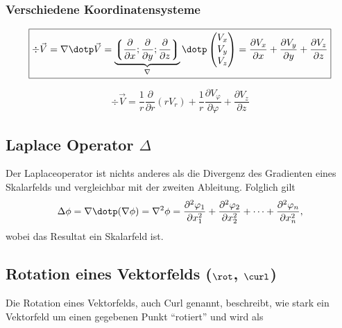 \subsubsection{Verschiedene Koordinatensysteme}
\[
    \boxed{
        \div \vec{V}
        = \nabla\dotp\vec{V}
        = \underbrace{%
            \left\lgroup%
                \frac{\partial}{\partial x};\frac{\partial}{\partial y};\frac{\partial}{\partial z}%
            \right\rgroup}_{\nabla} \dotp 
        \begin{pmatrix}
            V_x \\ V_y \\ V_z
        \end{pmatrix}
        = \frac{\partial V_x}{\partial x} + \frac{\partial V_y}{\partial y} + \frac{\partial V_z}{\partial z}
    }
\]

\[
    \boxed{
        \div \vec{V} = \frac{1}{r} \frac{\partial}{\partial r} (rV_r) + \frac{1}{r} \frac{\partial V_\varphi}{\partial \varphi} + \frac{\partial V_z}{\partial z}
    }
\]


\subsection[Laplace Operator Delta]{Laplace Operator $\Delta$}
Der Laplaceoperator ist nichts anderes als die Divergenz des Gradienten eines Skalarfelds und vergleichbar mit der zweiten Ableitung.
Folglich gilt
\[
    \Delta \phi = \nabla \dotp (\nabla \phi) = \nabla^2 \phi = \frac{\partial^2 \varphi_1}{\partial x_1^2} + \frac{\partial^2 \varphi_2}{\partial x_2^2} + \dots + \frac{\partial^2 \varphi_n}{\partial x_n^2},
\]
wobei das Resultat ein Skalarfeld ist.

\subsection[Rotation eines Vektorfelds (rot, curl)]{Rotation eines Vektorfelds ($\rot$, $\curl$)}
Die Rotation eines Vektorfelds, auch Curl genannt, beschreibt, wie stark ein Vektorfeld um einen gegebenen Punkt ``rotiert'' und wird als


